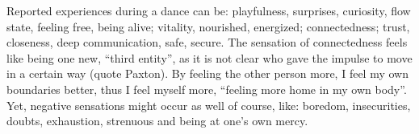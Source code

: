 Reported experiences during a dance can be: playfulness, surprises, curiosity, flow state, feeling free, being alive; vitality, nourished, energized; connectedness; trust, closeness, deep communication, safe, secure.
The sensation of connectedness feels like being one new, ``third entity'', as it is not clear who gave the impulse to move in a certain way (quote Paxton).
By feeling the other person more, I feel my own boundaries better, thus I feel myself more, ``feeling more home in my own body''.
Yet, negative sensations might occur as well of course, like: boredom, insecurities, doubts, exhaustion, strenuous and being at one's own mercy.
